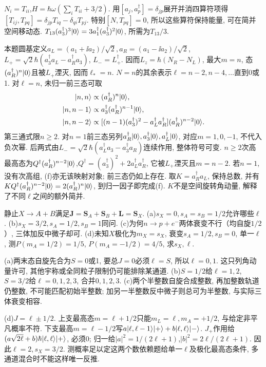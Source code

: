 \begin{solution}
$N_i=T_{ii}$,$H=\hbar\omega(\sum_iT_{ii}+3/2)$. 用$[a_j,a_p^\dagger]=\delta_{jp}$展开并消四算符项得$[T_{ij},T_{pq}]=\delta_{jp}T_{iq}-\delta_{qi}T_{pj}$. 特别$[N,T_{pq}]=0$, 所以这些算符保持能量, 可在简并空间移动态. $T_{13}(a_3^\dagger)^3\lvert 0\rangle=3a_1^\dagger(a_3^\dagger)^2\lvert 0\rangle$, 所需为$T_{13}/3$.

本题圆基定义$a_L=(a_1+\ii a_2)/\sqrt2,a_R=(a_1-\ii a_2)/\sqrt2$, $L_+=\sqrt2\hbar(a_3^\dagger a_L-a_R^\dagger a_3)$, $L_-=L_+^\dagger$. 因而$L_z=\hbar(N_R-N_L)$, 最大$m=n$, 态$(a_R^\dagger)^n\lvert 0\rangle$且被$L_+$湮灭, 因而$\ell_*=n$. $N=n$的其余表示$\ell=n-2,n-4,\ldots$直到0或1. 对$\ell=n$, 未归一前三态可取
\[
\begin{aligned}
\lvert n,n\rangle&\propto(a_R^\dagger)^n\lvert 0\rangle,\\
\lvert n,n-1\rangle&\propto a_3^\dagger(a_R^\dagger)^{n-1}\lvert 0\rangle,\\
\lvert n,n-2\rangle&\propto[(n-1)(a_3^\dagger)^2-a_L^\dagger a_R^\dagger](a_R^\dagger)^{n-2}\lvert 0\rangle.
\end{aligned}
\]
第三通式限$n\geq2$. 对$n=1$前三态另列$a_R^\dagger\lvert 0\rangle,a_3^\dagger\lvert 0\rangle,a_L^\dagger\lvert 0\rangle$, 对应$m=1,0,-1$, 不代入负次幂. 后两式由$L_-\!=\sqrt2\hbar(a_L^\dagger a_3-a_3^\dagger a_R)$连续作用, 整体符号可变. $n\geq2$次高最高态为$Q^\dagger(a_R^\dagger)^{n-2}\lvert 0\rangle$,$Q^\dagger=(a_3^\dagger)^2+2a_L^\dagger a_R^\dagger$, 它被$L_+$湮灭且$m=n-2$. 若$n=1$, 没有次高组, (f)亦无该映射对象; 前三态仍如上存在. 取$K=a_R^\dagger a_L$, 保持总数, 并有$KQ^\dagger(a_R^\dagger)^{n-2}\lvert 0\rangle=2(a_R^\dagger)^n\lvert 0\rangle$, 到归一因子即完成(f). $K$不是空间旋转角动量, 解释了不同$\ell$之间的额外简并.
\end{solution}
\begin{exercise}
静止$X\to A+B$满足$\boldsymbol J=\boldsymbol S_A+\boldsymbol S_B+\boldsymbol L=\boldsymbol S_X$. (a)$s_X=0,s_A=s_B=1/2$允许哪些$\ell$. (b)$s_X=3/2,s_A=1/2,s_B=1$同问. (c)为何$n\to p+e^-$两体衰变不行（均自旋$1/2$）, 三体加反中微子却可. (d)未知$X$极化为$m_X=s_X$, 衰变$s_A=1/2,s_B=0$, 单一$\ell$, 测$P(m_A=1/2)=1/5$, $P(m_A=-1/2)=4/5$, 求$s_X,\ell$.
\end{exercise}
\begin{solution}
(a)两末态自旋先合为$S=0$或1, 要总$J=0$必须$\ell=S$, 所以$\ell=0,1$. 这只列角动量许可, 其他宇称或全同粒子限制仍可能排除某通道. (b)$S=1/2$给$\ell=1,2$,$S=3/2$给$\ell=0,1,2,3$, 合并$0,1,2,3$. (c)两个半整数自旋合成整数, 再加整数轨道仍整数, 不可能匹配初始半整数; 加另一半整数反中微子则总可为半整数, 与实际三体衰变相容.

(d)$J=\ell\pm1/2$. 上支最高态$m=\ell+1/2$只能$m_L=\ell,m_A=+1/2$, 与给定非平凡概率不符. 下支最高$m=\ell-1/2$写$a\lvert \ell,\ell-1\rangle\lvert +\rangle+b\lvert \ell,\ell\rangle\lvert -\rangle$. $J_+$作用给$(a\sqrt{2\ell}+b)\hbar\lvert \ell,\ell\rangle\lvert +\rangle$, 必须0; 归一给$|a|^2=1/(2\ell+1)$,$|b|^2=2\ell/(2\ell+1)$. 因此$\ell=2,s_X=3/2$. 测概率足以定这两个数依赖题给单一$\ell$及极化最高态条件, 多通道混合时不能这样唯一反推.
\end{solution}
